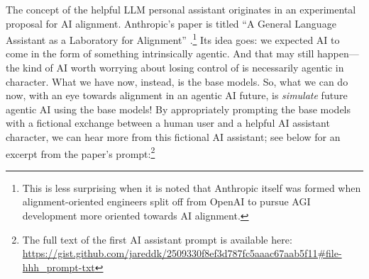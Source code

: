 The concept of the helpful LLM personal assistant originates in an experimental
proposal for AI alignment. Anthropic's paper is titled ``A General Language
Assistant as a Laboratory for Alignment''
\cite{askell2021assistant}.\footnote{This is less surprising when it is noted
that Anthropic itself was formed when alignment-oriented engineers split off
from OpenAI to pursue AGI development more oriented towards AI alignment.} Its
idea goes: we expected AI to come in the form of something intrinsically
agentic. And that may still happen---the kind of AI worth worrying about losing
control of is necessarily agentic in character. What we have now, instead, is
the base models. So, what we can do now, with an eye towards alignment in an
agentic AI future, is \emph{simulate} future agentic AI using the base models!
By appropriately prompting the base models with a fictional exchange between a
human user and a helpful AI assistant character, we can hear more from this
fictional AI assistant; see below for an excerpt from the paper's
prompt:\footnote{The full text of the first AI assistant prompt is available
here:
\url{https://gist.github.com/jareddk/2509330f8ef3d787fc5aaac67aab5f11\#file-hhh_prompt-txt}
}

